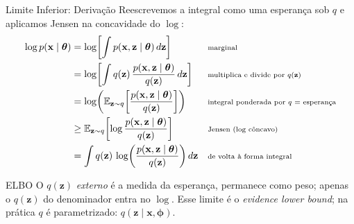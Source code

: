 \documentclass[aspectratio=169,xcolor=dvipsnames]{beamer}
\begin{document}
  \begin{frame}{Limite Inferior: Derivação}
    \small
    Reescrevemos a integral como uma esperança sob $q$ e aplicamos
    Jensen na concavidade do $\log$:
    {\small
    \begin{align*}
      \log p(\mathbf{x} \mid \bm{\theta})
      &= \log\!\left[\int p(\mathbf{x}, \mathbf{z} \mid \bm{\theta})\, d\mathbf{z}\right]
         && \text{\scriptsize marginal} \\
      &= \log\!\left[\int q(\mathbf{z})\,\frac{p(\mathbf{x}, \mathbf{z} \mid \bm{\theta})}{q(\mathbf{z})}\, d\mathbf{z}\right]
         && \text{\scriptsize multiplica e divide por $q(\mathbf{z})$} \\
      &= \log\!\left(\mathbb{E}_{\mathbf{z}\sim q}\!\left[\frac{p(\mathbf{x}, \mathbf{z} \mid \bm{\theta})}{q(\mathbf{z})}\right]\right)
         && \text{\scriptsize integral ponderada por $q$ $=$ esperança} \\
      &\geq \mathbb{E}_{\mathbf{z}\sim q}\!\left[\log\frac{p(\mathbf{x}, \mathbf{z} \mid \bm{\theta})}{q(\mathbf{z})}\right]
         && \text{\scriptsize Jensen ($\log$ côncavo)} \\
      &= \int q(\mathbf{z})\,\log\!\left(\frac{p(\mathbf{x}, \mathbf{z} \mid \bm{\theta})}{q(\mathbf{z})}\right) d\mathbf{z}
         && \text{\scriptsize de volta à forma integral}
    \end{align*}}
    \begin{block}{ELBO}
      \footnotesize O $q(\mathbf{z})$ \emph{externo} é a medida da esperança,
      permanece como peso; apenas o $q(\mathbf{z})$ do denominador entra no
      $\log$. Esse limite é o \textit{evidence lower bound}; na prática
      $q$ é parametrizado: $q(\mathbf{z} \mid \mathbf{x},\bm{\phi})$.
    \end{block}
  \end{frame}
\end{document}
